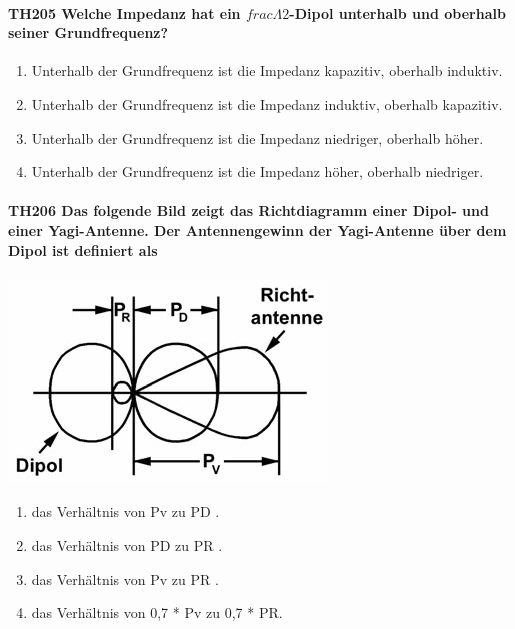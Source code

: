 \documentclass[8pt]{article}
\begin{document}
\paragraph*{TH205 Welche Impedanz hat ein $frac{\Lambda}{2}$-Dipol unterhalb und oberhalb seiner Grundfrequenz?} 
\begin{enumerate}[nolistsep,label=\Alph*]
\item Unterhalb der Grundfrequenz ist die Impedanz kapazitiv, oberhalb induktiv.
\item Unterhalb der Grundfrequenz ist die Impedanz induktiv, oberhalb kapazitiv.
\item Unterhalb der Grundfrequenz ist die Impedanz niedriger, oberhalb höher.
\item Unterhalb der Grundfrequenz ist die Impedanz höher, oberhalb niedriger.
\end{enumerate}

\paragraph*{TH206 Das folgende Bild zeigt das Richtdiagramm einer Dipol- und einer Yagi-Antenne. Der Antennengewinn der Yagi-Antenne über dem Dipol ist definiert als}
\begin{center}
	\begin{minipage}{\linewidth}
		\centering
		\includegraphics[scale=1.0]{pics/th206_a.jpg}
	\end{minipage}
\end{center}
\begin{enumerate}[nolistsep,label=\Alph*]
\item das Verhältnis von Pv zu PD .
\item das Verhältnis von PD zu PR .
\item das Verhältnis von Pv zu PR .
\item das Verhältnis von 0,7 * Pv zu 0,7 * PR.
\end{enumerate}
\end{document}
